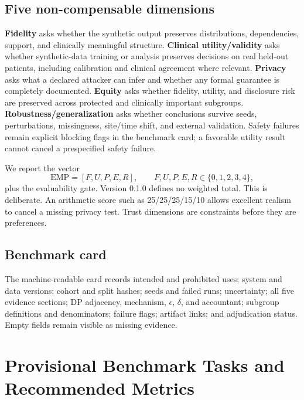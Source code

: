 \documentclass[11pt,letterpaper]{article}
\begin{document}
\subsection{Five non-compensable dimensions}

\textbf{Fidelity} asks whether the synthetic output preserves distributions, dependencies, support, and clinically meaningful structure. \textbf{Clinical utility/validity} asks whether synthetic-data training or analysis preserves decisions on real held-out patients, including calibration and clinical agreement where relevant. \textbf{Privacy} asks what a declared attacker can infer and whether any formal guarantee is completely documented. \textbf{Equity} asks whether fidelity, utility, and disclosure risk are preserved across protected and clinically important subgroups. \textbf{Robustness/generalization} asks whether conclusions survive seeds, perturbations, missingness, site/time shift, and external validation. Safety failures remain explicit blocking flags in the benchmark card; a favorable utility result cannot cancel a prespecified safety failure.

We report the vector
\begin{equation}
\mathrm{EMP} = [F, U, P, E, R], \qquad F,U,P,E,R \in \{0,1,2,3,4\},
\end{equation}
plus the evaluability gate. Version 0.1.0 defines no weighted total. This is deliberate. An arithmetic score such as 25/25/25/15/10 allows excellent realism to cancel a missing privacy test. Trust dimensions are constraints before they are preferences.

\subsection{Benchmark card}

The machine-readable card records intended and prohibited uses; system and data versions; cohort and split hashes; seeds and failed runs; uncertainty; all five evidence sections; DP adjacency, mechanism, $\epsilon$, $\delta$, and accountant; subgroup definitions and denominators; failure flags; artifact links; and adjudication status. Empty fields remain visible as missing evidence.

\section{Provisional Benchmark Tasks and Recommended Metrics}
\label{sec:tasks}
\end{document}
